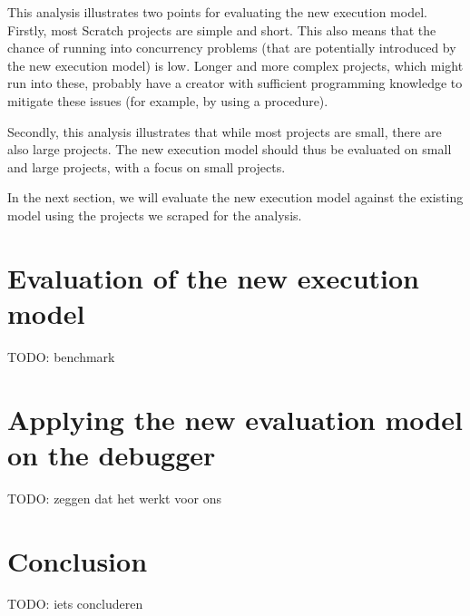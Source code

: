 \documentclass[../main]{subfiles}
\begin{document}
This analysis illustrates two points for evaluating the new execution model.
Firstly, most Scratch projects are simple and short.
This also means that the chance of running into concurrency problems (that are potentially introduced by the new execution model) is low.
Longer and more complex projects, which might run into these, probably have a creator with sufficient programming knowledge to mitigate these issues (for example, by using a procedure).

Secondly, this analysis illustrates that while most projects are small, there are also large projects.
The new execution model should thus be evaluated on small and large projects, with a focus on small projects.

In the next section, we will evaluate the new execution model against the existing model using the projects we scraped for the analysis.

\section{Evaluation of the new execution model}\label{sec:evaluation-of-the-new-execution-model}

TODO: benchmark


\section{Applying the new evaluation model on the debugger}\label{sec:applying-the-new-evaluation-model-on-the-debugger}

TODO: zeggen dat het werkt voor ons

\section{Conclusion}\label{sec:conclusion}

TODO: iets concluderen
\end{document}
